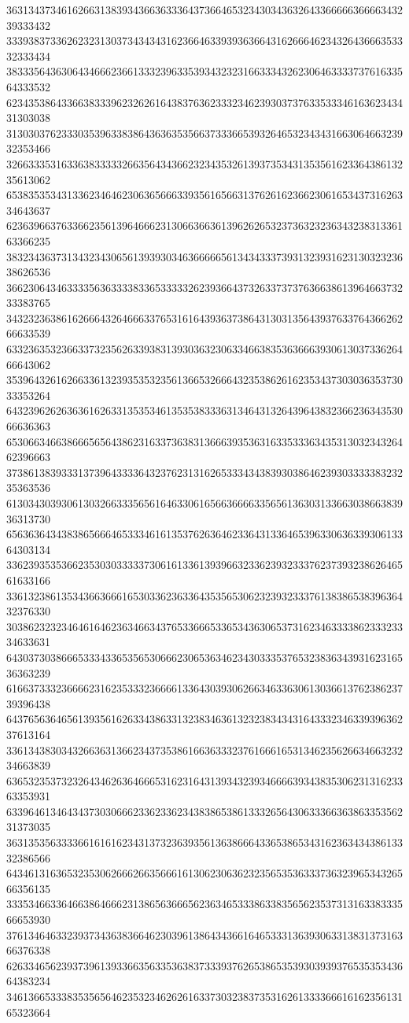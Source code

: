 36313437346162663138393436636333643736646532343034363264336666636666343239333432
33393837336262323130373434343162366463393936366431626664623432643666353332333434
38333564363064346662366133323963353934323231663334326230646333373761633564333532
62343538643366383339623262616438376362333234623930373763353334616362343431303038
31303037623330353963383864363635356637333665393264653234343166306466323932353466
32663335316336383333326635643436623234353261393735343135356162336438613235613062
65383535343133623464623063656663393561656631376261623662306165343731626334643637
62363966376336623561396466623130663663613962626532373632323634323831336163366235
38323436373134323430656139393034636666656134343337393132393162313032323638626536
36623064346333356363333833653333326239366437326337373763663861396466373233383765
34323236386162666432646663376531616439363738643130313564393763376436626266633539
63323635323663373235626339383139303632306334663835363666393061303733626466643062
35396432616266336132393535323561366532666432353862616235343730303635373033353264
64323962626363616263313535346135353833363134643132643964383236623634353066636363
65306634663866656564386231633736383136663935363163353336343531303234326462396663
37386138393331373964333364323762313162653334343839303864623930333338323235363536
61303430393061303266333565616463306165663666633565613630313366303866383936313730
65636364343838656664653334616135376263646233643133646539633063633930613364303134
33623935353662353030333337306161336139396632336239323337623739323862646561633166
33613238613534366366616530336236336435356530623239323337613838653839636432376330
30386232323464616462363466343765336665336534363065373162346333386233323334633631
64303730386665333433653565306662306536346234303335376532383634393162316536363239
61663733323666623162353332366661336430393062663463363061303661376238623739396438
64376563646561393561626334386331323834636132323834343164333234633939636237613164
33613438303432663631366234373538616636333237616661653134623562663466323234663839
63653235373232643462636466653162316431393432393466663934383530623131623363353931
63396461346434373030666233623362343838653861333265643063336636386335356231373035
36313535633336616161623431373236393561363866643365386534316236343438613332386566
64346131636532353062666266356661613062306362323565353633373632396534326566356135
33353466336466386466623138656366656236346533386338356562353731316338333566653930
37613464633239373436383664623039613864343661646533313639306331383137316366376338
62633465623937396139336635633536383733393762653865353930393937653535343664383234
34613665333835356564623532346262616337303238373531626133336661616235613165323664

